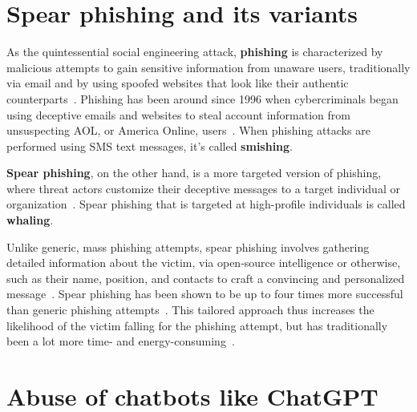 \section{Spear phishing and its variants}
\begin{comment}
\end{comment}


%
%
As the quintessential social engineering attack, \textbf{phishing} is characterized by malicious attempts to gain sensitive information from unaware users, traditionally via email and by using spoofed websites that look like their authentic counterparts~\citep{basit_Comprehensive_Survey_AI_Phishing_Detection_2021}. Phishing has been around since 1996 when cybercriminals began using deceptive emails and websites to steal account information from unsuspecting AOL, or America Online, users~\citep{wang_Defining_Social_Engineering_2020}. When phishing attacks are performed using SMS text messages, it’s called \textbf{smishing}.


%
%
\textbf{Spear phishing}, on the other hand, is a more targeted version of phishing, where threat actors customize their deceptive messages to a target individual or organization~\citep{fakhouri_AI_Driven_Solutions_SE_Attacks_2024}. Spear phishing that is targeted at high-profile individuals is called \textbf{whaling}.


%
%
Unlike generic, mass phishing attempts, spear phishing involves gathering detailed information about the victim, via open-source intelligence or otherwise, such as their name, position, and contacts to craft a convincing and personalized message~\citep{wang_Defining_Social_Engineering_2020}. Spear phishing has been shown to be up to four times more successful than generic phishing attempts~\citep{king_AI_Crime_Interdisciplinary_Analysis_2019}. This tailored approach thus increases the likelihood of the victim falling for the phishing attempt, but has traditionally been a lot more time- and energy-consuming~\citep {mirsky_Threat_Offensive_AI_Organizations_2023}.






\section{Abuse of chatbots like ChatGPT}
\begin{comment}
\end{comment}

